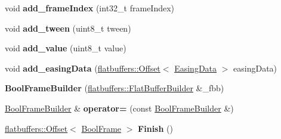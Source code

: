 \begin{DoxyCompactItemize}
\item 
\mbox{\label{structflatbuffers_1_1BoolFrameBuilder_a22b139f36a12295c35d4dd50854fa02b}} 
void {\bfseries add\+\_\+frame\+Index} (int32\+\_\+t frame\+Index)
\item 
\mbox{\label{structflatbuffers_1_1BoolFrameBuilder_a864b9359bd51d01bd701d3e22f1c4815}} 
void {\bfseries add\+\_\+tween} (uint8\+\_\+t tween)
\item 
\mbox{\label{structflatbuffers_1_1BoolFrameBuilder_af93c40f42bdeb8f4c27c6d5e7066d585}} 
void {\bfseries add\+\_\+value} (uint8\+\_\+t value)
\item 
\mbox{\label{structflatbuffers_1_1BoolFrameBuilder_ae28e29be50b9339aa748809b40eef13f}} 
void {\bfseries add\+\_\+easing\+Data} (\hyperlink{structflatbuffers_1_1Offset}{flatbuffers\+::\+Offset}$<$ \hyperlink{structflatbuffers_1_1EasingData}{Easing\+Data} $>$ easing\+Data)
\item 
\mbox{\label{structflatbuffers_1_1BoolFrameBuilder_ae0be7b132b7ad8677028950332d9582f}} 
{\bfseries Bool\+Frame\+Builder} (\hyperlink{classflatbuffers_1_1FlatBufferBuilder}{flatbuffers\+::\+Flat\+Buffer\+Builder} \&\+\_\+fbb)
\item 
\mbox{\label{structflatbuffers_1_1BoolFrameBuilder_a895ed5468fbd79fecfa88371349294f8}} 
\hyperlink{structflatbuffers_1_1BoolFrameBuilder}{Bool\+Frame\+Builder} \& {\bfseries operator=} (const \hyperlink{structflatbuffers_1_1BoolFrameBuilder}{Bool\+Frame\+Builder} \&)
\item 
\mbox{\label{structflatbuffers_1_1BoolFrameBuilder_a2a0f643b0fffd7baefbffcbfe484492c}} 
\hyperlink{structflatbuffers_1_1Offset}{flatbuffers\+::\+Offset}$<$ \hyperlink{structflatbuffers_1_1BoolFrame}{Bool\+Frame} $>$ {\bfseries Finish} ()
\end{DoxyCompactItemize}

